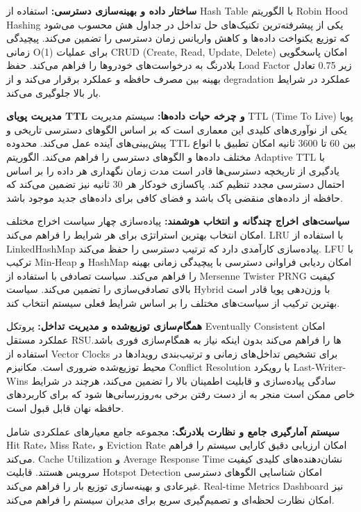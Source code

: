 \documentclass[11pt]{article}
\begin{document}
\textbf{ساختار داده و بهینه‌سازی دسترسی:} استفاده از Hash Table با الگوریتم Robin Hood Hashing یکی از پیشرفته‌ترین تکنیک‌های حل تداخل در جداول هش محسوب می‌شود که توزیع یکنواخت داده‌ها و کاهش واریانس زمان دسترسی را تضمین می‌کند. پیچیدگی زمانی O(1) برای عملیات CRUD (Create, Read, Update, Delete) امکان پاسخگویی بلادرنگ به درخواست‌های خودروها را فراهم می‌کند. حفظ Load Factor زیر 0.75 تعادل بهینه بین مصرف حافظه و عملکرد برقرار می‌کند و از degradation عملکرد در شرایط بار بالا جلوگیری می‌کند.

\textbf{مدیریت پویای TTL و چرخه حیات داده‌ها:} سیستم مدیریت TTL (Time To Live) پویا یکی از نوآوری‌های کلیدی این معماری است که بر اساس الگوهای دسترسی تاریخی و پیش‌بینی‌های آینده عمل می‌کند. محدوده TTL بین 60 تا 3600 ثانیه امکان تطبیق با انواع مختلف داده‌ها و الگوهای دسترسی را فراهم می‌کند. الگوریتم Adaptive TTL با یادگیری از تاریخچه دسترسی‌ها قادر است مدت زمان نگهداری هر داده را بر اساس احتمال دسترسی مجدد تنظیم کند. پاکسازی خودکار هر 30 ثانیه نیز تضمین می‌کند که حافظه از داده‌های منقضی پاک باشد و فضای کافی برای داده‌های جدید موجود باشد.

\textbf{سیاست‌های اخراج چندگانه و انتخاب هوشمند:} پیاده‌سازی چهار سیاست اخراج مختلف امکان انتخاب بهترین استراتژی برای هر شرایط را فراهم می‌کند. LRU با استفاده از LinkedHashMap پیاده‌سازی کارآمدی دارد که ترتیب دسترسی را حفظ می‌کند. LFU با ترکیب Min-Heap و HashMap امکان ردیابی فراوانی دسترسی با پیچیدگی زمانی بهینه را فراهم می‌کند. سیاست تصادفی با استفاده از Mersenne Twister PRNG کیفیت بالای تصادفی‌سازی را تضمین می‌کند. سیاست Hybrid با وزن‌دهی پویا قادر است بهترین ترکیب از سیاست‌های مختلف را بر اساس شرایط فعلی سیستم انتخاب کند.

\textbf{همگام‌سازی توزیع‌شده و مدیریت تداخل:} پروتکل Eventually Consistent امکان عملکرد مستقل RSUها را فراهم می‌کند بدون اینکه نیاز به همگام‌سازی فوری باشد. استفاده از Vector Clocks برای تشخیص تداخل‌های زمانی و ترتیب‌بندی رویدادها در محیط توزیع‌شده ضروری است. مکانیزم Conflict Resolution با رویکرد Last-Writer-Wins سادگی پیاده‌سازی و قابلیت اطمینان بالا را تضمین می‌کند، هرچند در شرایط خاص ممکن است منجر به از دست رفتن برخی به‌روزرسانی‌ها شود که برای کاربردهای حافظه نهان قابل قبول است.

\textbf{سیستم آمارگیری جامع و نظارت بلادرنگ:} مجموعه جامع معیارهای عملکردی شامل Hit Rate، Miss Rate، و Eviction Rate امکان ارزیابی دقیق کارایی سیستم را فراهم می‌کند. Cache Utilization و Average Response Time نشان‌دهنده‌های کلیدی کیفیت سرویس هستند. قابلیت Hotspot Detection امکان شناسایی الگوهای دسترسی غیرعادی و بهینه‌سازی توزیع بار را فراهم می‌کند. Real-time Metrics Dashboard نیز امکان نظارت لحظه‌ای و تصمیم‌گیری سریع برای مدیران سیستم را فراهم می‌کند.
\end{document}
